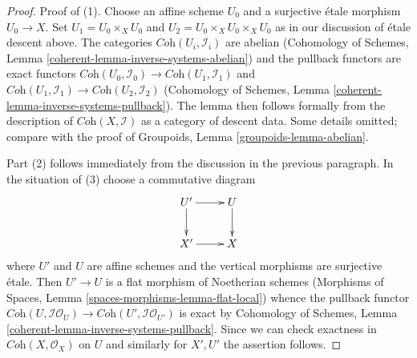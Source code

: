 \documentclass[10pt,a4paper]{amsart}
\theoremstyle{plain}
\theoremstyle{definition}
\theoremstyle{remark}
\numberwithin{equation}{subsection}
\begin{document}
\begin{proof}
Proof of (1). Choose an affine scheme $U_0$ and a surjective \'etale morphism
$U_0 \to X$. Set $U_1 = U_0 \times_X U_0$ and
$U_2 = U_0 \times_X U_0 \times_X U_0$ as in our discussion of
\'etale descent above. The categories $\textit{Coh}(U_i, \mathcal{I}_i)$
are abelian
(Cohomology of Schemes, Lemma \ref{coherent-lemma-inverse-systems-abelian})
and the pullback functors are exact functors
$\textit{Coh}(U_0, \mathcal{I}_0) \to \textit{Coh}(U_1, \mathcal{I}_1)$
and
$\textit{Coh}(U_1, \mathcal{I}_1) \to \textit{Coh}(U_2, \mathcal{I}_2)$
(Cohomology of Schemes, Lemma \ref{coherent-lemma-inverse-systems-pullback}).
The lemma then follows formally from the description of
$\textit{Coh}(X, \mathcal{I})$ as a category of descent data.
Some details omitted; compare with the proof of
Groupoids, Lemma \ref{groupoids-lemma-abelian}.

\medskip\noindent
Part (2) follows immediately from the discussion in the previous paragraph.
In the situation of (3) choose a commutative diagram
$$
\xymatrix{
U' \ar[d] \ar[r] & U \ar[d] \\
X' \ar[r] & X
}
$$
where $U'$ and $U$ are affine schemes and the vertical morphisms are
surjective \'etale. Then $U' \to U$ is a flat morphism of Noetherian
schemes (Morphisms of Spaces, Lemma \ref{spaces-morphisms-lemma-flat-local})
whence the pullback functor
$\textit{Coh}(U, \mathcal{I}\mathcal{O}_U) \to
\textit{Coh}(U', \mathcal{I}\mathcal{O}_{U'})$
is exact by
Cohomology of Schemes, Lemma \ref{coherent-lemma-inverse-systems-pullback}.
Since we can check exactness in $\textit{Coh}(X, \mathcal{O}_X)$
on $U$ and similarly for $X', U'$ the assertion follows.
\end{proof}
\end{document}
